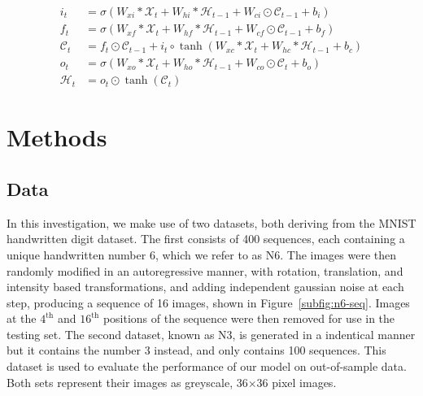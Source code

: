 \documentclass[twocolumn]{article}
\begin{document}
\begin{equation}
    \begin{aligned}
    i_t &= \sigma(W_{xi}\ast \mathcal{X}_t + W_{hi}\ast \mathcal{H}_{t-1} + W_{ci}\odot \mathcal{C}_{t-1} + b_i) \\
    f_t &= \sigma(W_{xf}\ast \mathcal{X}_t + W_{hf}\ast \mathcal{H}_{t-1} + W_{cf}\odot \mathcal{C}_{t-1}+b_f) \\
    \mathcal{C}_t &= f_t \odot \mathcal{C}_{t-1} + i_t \circ \tanh(W_{xc} \ast \mathcal{X}_t + W_{hc} \ast \mathcal{H}_{t-1}+b_c) \\
    o_t &= \sigma(W_{xo}\ast \mathcal{X}_t + W_{ho}\ast \mathcal{H}_{t-1} + W_{co}\odot \mathcal{C}_{t}  +b_o) \\
    \mathcal{H}_t &= o_t \odot \tanh(\mathcal{C}_t)
    \end{aligned}
    \label{eq:convlstm}
\end{equation}

\section{Methods}

\subsection{Data}\label{sec:data}

In this investigation, we make use of two datasets, both deriving from the MNIST handwritten digit dataset. The first consists of 400 sequences, each containing a unique handwritten number 6, which we refer to as N6. The images were then randomly modified in an autoregressive manner, with rotation, translation, and intensity based transformations, and adding independent gaussian noise at each step, producing a sequence of 16 images, shown in Figure~\ref{subfig:n6-seq}. Images at the $4^\text{th}$ and $16^\text{th}$ positions of the sequence were then removed for use in the testing set. The second dataset, known as N3, is generated in a indentical manner but it contains the number 3 instead, and only contains 100 sequences. This dataset is used to evaluate the performance of our model on out-of-sample data. Both sets represent their images as greyscale, 36$\times$36 pixel images. 
\end{document}
